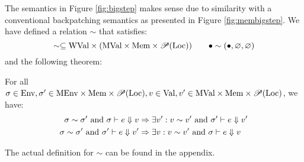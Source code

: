 The semantics in Figure \ref{fig:bigstep} makes sense due to similarity with a conventional backpatching semantics as presented in Figure \ref{fig:membigstep}.
We have defined a relation $\sim$ that satisfies:
\[\sim\subseteq\text{WVal}\times(\text{MVal}\times\text{Mem}\times\mathscr{P}(\text{Loc}))\qquad\bullet\sim(\bullet,\varnothing,\varnothing)\]
and the following theorem:
\begin{theorem}\normalfont
  For all $\sigma\in\text{Env},\sigma'\in\text{MEnv}\times\text{Mem}\times\mathscr{P}(\text{Loc}),v\in\text{Val},v'\in\text{MVal}\times\text{Mem}\times\mathscr{P}(\text{Loc})$, we have:
  \begin{align*}
    \sigma\sim\sigma'\text{ and }\sigma\vdash e\Downarrow v   & \Rightarrow\exists v':v\sim v'\text{ and }\sigma'\vdash e\Downarrow v' \\
    \sigma\sim\sigma'\text{ and }\sigma'\vdash e\Downarrow v' & \Rightarrow\exists v:v\sim v'\text{ and }\sigma\vdash e\Downarrow v
  \end{align*}
\end{theorem}
The actual definition for $\sim$ can be found in the appendix.
